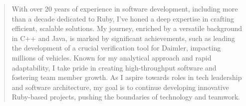 \begin{quote}
With over 20 years of experience in software development, including more than a decade dedicated to Ruby, I've honed a deep expertise in crafting efficient, scalable solutions. 
My journey, enriched by a versatile background in C++ and Java, is marked by significant achievements, such as leading the development of a crucial verification tool for Daimler, impacting millions of vehicles. 
Known for my analytical approach and rapid adaptability, I take pride in creating high-throughput software and fostering team member growth. 
As I aspire towards roles in tech leadership and software architecture, my goal is to continue developing innovative Ruby-based projects, pushing the boundaries of technology and teamwork.   
\end{quote}
